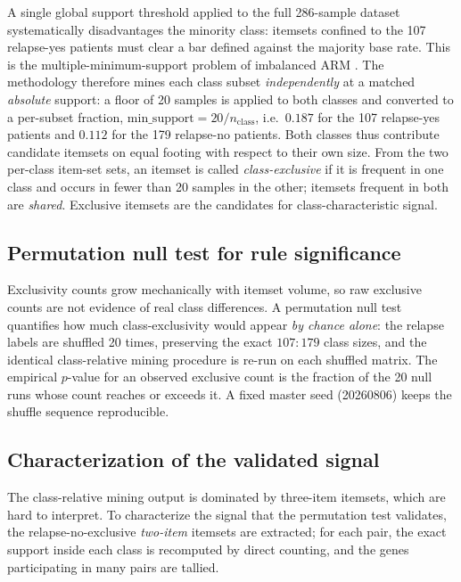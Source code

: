 \documentclass[twocolumn]{article}
\begin{document}
A single global support threshold applied to the full 286-sample dataset
systematically disadvantages the minority class: itemsets confined to the 107
relapse-yes patients must clear a bar defined against the majority base rate.
This is the multiple-minimum-support problem of imbalanced ARM
\citep{liu1999mining}. The methodology therefore mines each class subset
\emph{independently} at a matched \emph{absolute} support: a floor of 20
samples is applied to both classes and converted to a per-subset fraction,
$\mathrm{min\_support} = 20/n_{\mathrm{class}}$, i.e.\ $0.187$ for the 107
relapse-yes patients and $0.112$ for the 179 relapse-no patients. Both classes
thus contribute candidate itemsets on equal footing with respect to their own
size. From the two per-class item-set sets, an itemset is called
\emph{class-exclusive} if it is frequent in one class and occurs in fewer than
20 samples in the other; itemsets frequent in both are \emph{shared}.
Exclusive itemsets are the candidates for class-characteristic signal.

\subsection{Permutation null test for rule significance}
\label{sec:method-perm}

Exclusivity counts grow mechanically with itemset volume, so raw exclusive
counts are not evidence of real class differences. A permutation null test
quantifies how much class-exclusivity would appear \emph{by chance alone}: the
relapse labels are shuffled 20 times, preserving the exact $107{:}179$ class
sizes, and the identical class-relative mining procedure is re-run on each
shuffled matrix. The empirical $p$-value for an observed exclusive count is the
fraction of the 20 null runs whose count reaches or exceeds it. A fixed master
seed (20260806) keeps the shuffle sequence reproducible.

\subsection{Characterization of the validated signal}
\label{sec:method-char}

The class-relative mining output is dominated by three-item itemsets, which
are hard to interpret. To characterize the signal that the permutation test
validates, the relapse-no-exclusive \emph{two-item} itemsets are extracted;
for each pair, the exact support inside each class is recomputed by direct
counting, and the genes participating in many pairs are tallied.
\end{document}
